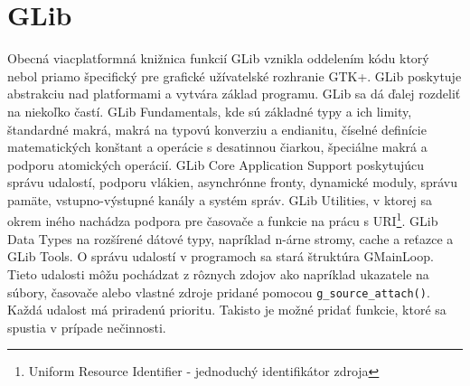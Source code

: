 \documentclass[12pt,oneside,final]{fithesis2}
\begin{document}
\section{GLib}
Obecná viacplatformná knižnica funkcií GLib vznikla oddelením kódu ktorý nebol priamo špecifický pre grafické užívatelské rozhranie GTK+. GLib poskytuje abstrakciu nad platformami a vytvára základ programu. GLib sa dá ďalej rozdeliť na niekoľko častí. GLib Fundamentals, kde sú základné typy a ich limity, štandardné makrá, makrá na typovú konverziu a endianitu, číselné definície matematických konštant a operácie s desatinnou čiarkou, špeciálne makrá a podporu atomických operácií. GLib Core Application Support poskytujúcu správu udalostí, podporu vlákien, asynchrónne fronty, dynamické moduly, správu pamäte, vstupno-výstupné kanály a systém správ. GLib Utilities, v ktorej sa okrem iného nachádza podpora pre časovače a funkcie na prácu s URI\footnote{Uniform Resource Identifier - jednoduchý identifikátor zdroja}. GLib Data Types na rozšírené dátové typy, napríklad n-árne stromy, cache a reťazce a GLib Tools.
O správu udalostí v programoch sa stará štruktúra GMainLoop. Tieto udalosti môžu pochádzat z rôznych zdojov ako napríklad ukazatele na súbory, časovače alebo vlastné zdroje pridané pomocou \verb|g_source_attach()|. Každá udalost má priradenú prioritu. Takisto je možné pridať funkcie, ktoré sa spustia v prípade nečinnosti.
\end{document}
